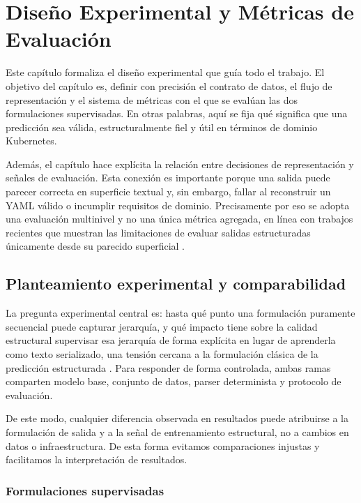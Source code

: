 %
\chapter{Diseño Experimental y Métricas de Evaluación}
\label{ch::chapter4}

Este capítulo formaliza el diseño experimental que guía todo el trabajo. El objetivo del capítulo es, definir con precisión el contrato de datos, el 
flujo de representación y el sistema de métricas con el que se evalúan las dos formulaciones
supervisadas. En otras palabras, aquí se fija qué significa que una predicción sea válida, estructuralmente fiel y útil en términos de dominio Kubernetes.

Además, el capítulo hace explícita la relación entre decisiones de representación y señales de evaluación. Esta conexión es importante porque una
salida puede parecer correcta en superficie textual y, sin embargo, fallar al reconstruir un YAML válido o incumplir requisitos de dominio. Precisamente
por eso se adopta una evaluación multinivel y no una única métrica agregada, en línea con trabajos recientes que muestran las limitaciones de evaluar
salidas estructuradas únicamente desde su parecido superficial \citep{yang2025structeval, xu2024cloudevalyaml}.

\section{Planteamiento experimental y comparabilidad}
\label{sec:ch4_design}

La pregunta experimental central es: hasta qué punto una formulación puramente secuencial puede capturar jerarquía, y qué impacto tiene sobre la
calidad estructural supervisar esa jerarquía de forma explícita en lugar de aprenderla como texto serializado, una tensión cercana a la formulación clásica de
la predicción estructurada \citep{joachims2009structured, belanger2017spen}. Para responder de forma controlada,
ambas ramas comparten modelo base, conjunto de datos, parser determinista y protocolo de evaluación.

De este modo, cualquier diferencia observada en resultados puede atribuirse a la formulación de salida y a la señal de entrenamiento estructural, no a
cambios en datos o infraestructura. De esta forma evitamos comparaciones injustas y facilitamos la interpretación de resultados.

\subsection{Formulaciones supervisadas}
\label{sec:ch4_formulations}

